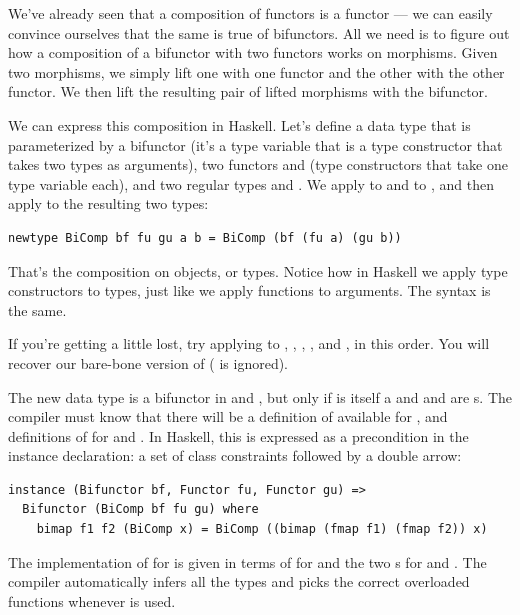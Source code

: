 We've already seen that a composition of functors is a functor --- we
can easily convince ourselves that the same is true of bifunctors. All
we need is to figure out how a composition of a bifunctor with two
functors works on morphisms. Given two morphisms, we simply lift one
with one functor and the other with the other functor. We then lift the
resulting pair of lifted morphisms with the bifunctor.

We can express this composition in Haskell. Let's define a data type
that is parameterized by a bifunctor  (it's a type variable
that is a type constructor that takes two types as arguments), two
functors  and  (type constructors that take one
type variable each), and two regular types  and . We
apply  to  and  to , and then
apply  to the resulting two types:

\begin{Verbatim}
newtype BiComp bf fu gu a b = BiComp (bf (fu a) (gu b))
\end{Verbatim}
That's the composition on objects, or types. Notice how in Haskell we
apply type constructors to types, just like we apply functions to
arguments. The syntax is the same.

If you're getting a little lost, try applying  to
, , , , and
, in this order. You will recover our bare-bone version of
 ( is ignored).

The new data type  is a bifunctor in  and
, but only if  is itself a  and
 and  are s. The compiler must
know that there will be a definition of  available for
, and definitions of  for  and
. In Haskell, this is expressed as a precondition in the
instance declaration: a set of class constraints followed by a double
arrow:

\begin{verbatim}
instance (Bifunctor bf, Functor fu, Functor gu) =>
  Bifunctor (BiComp bf fu gu) where
    bimap f1 f2 (BiComp x) = BiComp ((bimap (fmap f1) (fmap f2)) x) 
\end{verbatim}
The implementation of  for  is given in
terms of  for  and the two s for
 and . The compiler automatically infers all the
types and picks the correct overloaded functions whenever
 is used.

